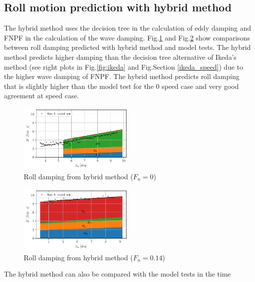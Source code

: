 \subsection*{Roll motion prediction with hybrid
method}\label{roll-motion-prediction-with-hybrid-method}
The hybrid method uses the decision tree in the calculation of eddy
damping and FNPF in the calculation of the wave damping.
Fig.\ref{fig:hybrid_0} and Fig.\ref{fig:hybrid_speed}
show comparisons between roll damping predicted with hybrid method and
model tests. The hybrid method predicts higher damping than the decision
tree alternative of Ikeda's method (see right plots in
Fig.\ref{fig:ikeda} and Fig.Section \ref{ikeda_speed}) due to
the higher wave damping of FNPF. The hybrid method predicts roll damping
that is slightly higher than the model test for the 0 speed case and
very good agreement at speed case.
\begin{figure}[H]
\begin{center}\includegraphics[width = 0.5\textwidth]{figures/hybrid_0.pdf}\end{center}
\vspace{-1cm}
\caption{Roll damping from hybrid method ($F_n = 0$)}
\label{fig:hybrid_0}
\end{figure}
\begin{figure}[H]
\begin{center}\includegraphics[width = 0.5\textwidth]{figures/hybrid_speed.pdf}\end{center}
\vspace{-1cm}
\caption{Roll damping from hybrid method ($F_n = 0.14$)}
\label{fig:hybrid_speed}
\end{figure}
The hybrid method can also be compared with the model tests in the time
